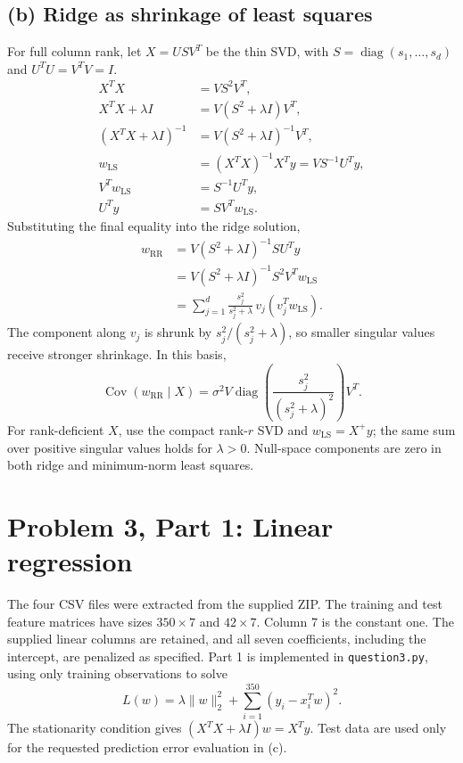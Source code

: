 \documentclass[10pt]{article}
\newcommand{\Cov}{\operatorname{Cov}}
\begin{document}
\subsection*{(b) Ridge as shrinkage of least squares}
For full column rank, let $X=USV^T$ be the thin SVD, with
$S=\operatorname{diag}(s_1,\ldots,s_d)$ and $U^TU=V^TV=I$.
\begin{align*}
X^TX&=VS^2V^T,\\
X^TX+\lambda I&=V(S^2+\lambda I)V^T,\\
(X^TX+\lambda I)^{-1}&=V(S^2+\lambda I)^{-1}V^T,\\
w_{\mathrm{LS}}&=(X^TX)^{-1}X^Ty=VS^{-1}U^Ty,\\
V^Tw_{\mathrm{LS}}&=S^{-1}U^Ty,\\
U^Ty&=SV^Tw_{\mathrm{LS}}.
\end{align*}
Substituting the final equality into the ridge solution,
\begin{align*}
w_{\mathrm{RR}}&=V(S^2+\lambda I)^{-1}SU^Ty\\
&=V(S^2+\lambda I)^{-1}S^2V^Tw_{\mathrm{LS}}\\
&=\sum_{j=1}^d\frac{s_j^2}{s_j^2+\lambda}\,v_j(v_j^Tw_{\mathrm{LS}}).
\end{align*}
The component along $v_j$ is shrunk by $s_j^2/(s_j^2+\lambda)$, so smaller singular values receive stronger shrinkage. In this basis,
\[
\Cov(w_{\mathrm{RR}}\mid X)=\sigma^2V\operatorname{diag}\!\left(\frac{s_j^2}{(s_j^2+\lambda)^2}\right)V^T.
\]
For rank-deficient $X$, use the compact rank-$r$ SVD and $w_{\mathrm{LS}}=X^+y$; the same sum over positive singular values holds for $\lambda>0$. Null-space components are zero in both ridge and minimum-norm least squares.
\clearpage
\section*{Problem 3, Part 1: Linear regression}
The four CSV files were extracted from the supplied ZIP. The training and test feature matrices have sizes $350\times7$ and $42\times7$. Column 7 is the constant one. The supplied linear columns are retained, and all seven coefficients, including the intercept, are penalized as specified. Part 1 is implemented in \texttt{question3.py}, using only training observations to solve
\[
L(w)=\lambda\|w\|_2^2+\sum_{i=1}^{350}(y_i-x_i^Tw)^2.
\]
The stationarity condition gives $(X^TX+\lambda I)w=X^Ty$. Test data are used only for the requested prediction error evaluation in (c).
\end{document}
